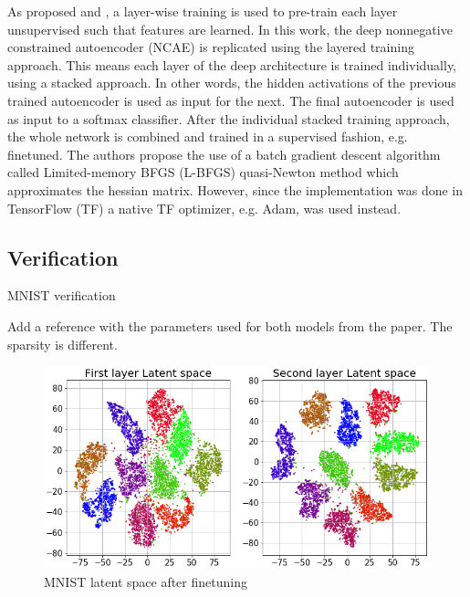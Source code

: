\documentclass{article}
\begin{document}
As proposed \cite{Hosseini-Asl2016} and \cite{Vincent}, a layer-wise training is used to pre-train each layer unsupervised such that features are learned. In this work, the deep nonnegative constrained autoencoder (NCAE) is replicated using the layered training approach. This means each layer of the deep architecture is trained individually, using a stacked approach. In other words, the hidden activations of the previous trained autoencoder is used as input for the next. The final autoencoder is used as input to a softmax classifier. After the individual stacked training approach, the whole network is combined and trained in a supervised fashion, e.g. finetuned. The authors propose the use of a batch gradient descent algorithm called Limited-memory BFGS (L-BFGS) quasi-Newton method which approximates the hessian matrix. However, since the implementation was done in TensorFlow (TF) a native TF optimizer, e.g. Adam, was used instead. 

\subsection{Verification}

MNIST verification

Add a reference with the parameters used for both models from the paper. The sparsity is different. %


\begin{figure}[H]
	\centering
	\includegraphics[width=1\linewidth]{latent_space_finetune_no_legend.png}  
	\caption{MNIST latent space after finetuning}
\end{figure}
\end{document}
